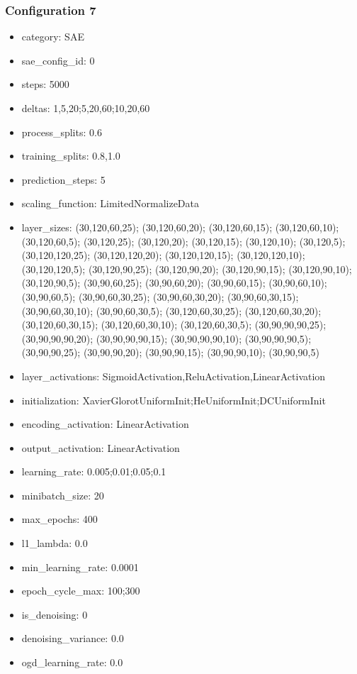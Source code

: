 \documentclass[a4paper,11pt,oneside]{article}
\theoremstyle{plain}
\theoremstyle{definition}
\begin{document}
	\subsubsection{Configuration 7}\label{config7}
	\begin{itemize}
		\item category: SAE
		\item sae\_config\_id: 0
		\item steps: 5000
		\item deltas: 1,5,20;5,20,60;10,20,60
		\item process\_splits: 0.6
		\item training\_splits: 0.8,1.0
		\item prediction\_steps: 5
		\item scaling\_function: LimitedNormalizeData
		\item layer\_sizes: (30,120,60,25); (30,120,60,20); (30,120,60,15); (30,120,60,10); (30,120,60,5); (30,120,25); (30,120,20); (30,120,15); (30,120,10); (30,120,5); (30,120,120,25); (30,120,120,20); (30,120,120,15); (30,120,120,10); (30,120,120,5); (30,120,90,25); (30,120,90,20); (30,120,90,15); (30,120,90,10); (30,120,90,5); (30,90,60,25); (30,90,60,20); (30,90,60,15); (30,90,60,10); (30,90,60,5); (30,90,60,30,25); (30,90,60,30,20); (30,90,60,30,15); (30,90,60,30,10); (30,90,60,30,5); (30,120,60,30,25); (30,120,60,30,20); (30,120,60,30,15); (30,120,60,30,10); (30,120,60,30,5); (30,90,90,90,25); (30,90,90,90,20); (30,90,90,90,15); (30,90,90,90,10); (30,90,90,90,5);(30,90,90,25); (30,90,90,20); (30,90,90,15); (30,90,90,10); (30,90,90,5)
		\item layer\_activations: SigmoidActivation,ReluActivation,LinearActivation
		\item initialization: XavierGlorotUniformInit;HeUniformInit;DCUniformInit
		\item encoding\_activation: LinearActivation
		\item output\_activation: LinearActivation
		\item learning\_rate: 0.005;0.01;0.05;0.1
		\item minibatch\_size: 20
		\item max\_epochs: 400
		\item l1\_lambda: 0.0
		\item min\_learning\_rate: 0.0001
		\item epoch\_cycle\_max: 100;300
		\item is\_denoising: 0
		\item denoising\_variance: 0.0
		\item ogd\_learning\_rate: 0.0
	\end{itemize}
	
\end{document}
